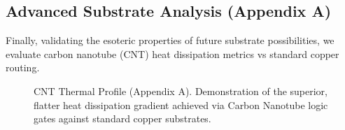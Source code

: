 \documentclass{article}
\begin{document}
\subsection{Advanced Substrate Analysis (Appendix A)}

Finally, validating the esoteric properties of future substrate possibilities, we evaluate carbon nanotube (CNT) heat dissipation metrics vs standard copper routing.

\begin{figure}[H]
    \centering
    \caption{CNT Thermal Profile (Appendix A). Demonstration of the superior, flatter heat dissipation gradient achieved via Carbon Nanotube logic gates against standard copper substrates.}
    \label{fig:cnt_thermal}
\end{figure}
\end{document}
